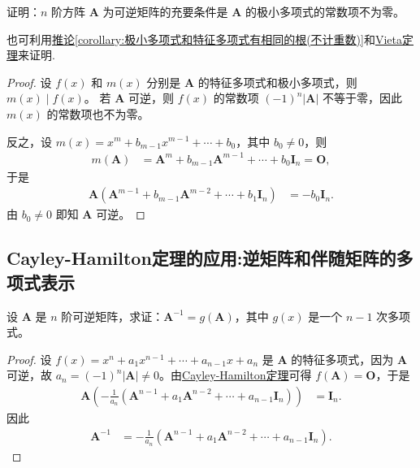 \documentclass[../../main.tex]{subfiles}%
\begin{document}
\begin{proposition}\label{proposition:矩阵可逆充要条件极小多项式常数项非零}
证明：\(n\) 阶方阵 \(\boldsymbol{A}\) 为可逆矩阵的充要条件是 \(\boldsymbol{A}\) 的极小多项式的常数项不为零。
\end{proposition}
\begin{note}
也可利用\hyperref[corollary:极小多项式和特征多项式有相同的根(不计重数)]{推论\ref{corollary:极小多项式和特征多项式有相同的根(不计重数)}}和\hyperref[theorem:Vieta定理]{Vieta定理}来证明.
\end{note}
\begin{proof}

设 \(f(x)\) 和 \(m(x)\) 分别是 \(\boldsymbol{A}\) 的特征多项式和极小多项式，则 \(m(x)\mid f(x)\)。
若 \(\boldsymbol{A}\) 可逆，则 \(f(x)\) 的常数项 \((-1)^n|\boldsymbol{A}|\) 不等于零，因此 \(m(x)\) 的常数项也不为零。

反之，设 \(m(x)=x^m + b_{m - 1}x^{m - 1}+\cdots + b_0\)，其中 \(b_0\neq 0\)，则
\begin{align*}
m(\boldsymbol{A})&=\boldsymbol{A}^m + b_{m - 1}\boldsymbol{A}^{m - 1}+\cdots + b_0\boldsymbol{I}_n=\boldsymbol{O},
\end{align*}
于是
\begin{align*}
\boldsymbol{A}(\boldsymbol{A}^{m - 1}+b_{m - 1}\boldsymbol{A}^{m - 2}+\cdots + b_1\boldsymbol{I}_n)&=-b_0\boldsymbol{I}_n.
\end{align*}
由 \(b_0\neq 0\) 即知 \(\boldsymbol{A}\) 可逆。

\end{proof}

\subsection{Cayley-Hamilton定理的应用:逆矩阵和伴随矩阵的多项式表示}

\begin{proposition}[矩阵的逆可由其多项式表示]\label{proposition:矩阵的逆可以用其多项式表示}
设 \(\boldsymbol{A}\) 是 \(n\) 阶可逆矩阵，求证：\(\boldsymbol{A}^{-1}=g(\boldsymbol{A})\)，其中 \(g(x)\) 是一个 \(n - 1\) 次多项式。
\end{proposition}
\begin{proof}

设 \(f(x)=x^n + a_1x^{n - 1}+\cdots + a_{n - 1}x + a_n\) 是 \(\boldsymbol{A}\) 的特征多项式，因为 \(\boldsymbol{A}\) 可逆，故 \(a_n = (-1)^n|\boldsymbol{A}|\neq 0\)。由\hyperref[theorem:Cayley-Hamilton定理]{Cayley-Hamilton定理}可得 \(f(\boldsymbol{A})=\boldsymbol{O}\)，于是
\begin{align*}
\boldsymbol{A}\left(-\frac{1}{a_n}(\boldsymbol{A}^{n - 1}+a_1\boldsymbol{A}^{n - 2}+\cdots + a_{n - 1}\boldsymbol{I}_n)\right)&=\boldsymbol{I}_n.
\end{align*}
因此
\begin{align*}
\boldsymbol{A}^{-1}&=-\frac{1}{a_n}(\boldsymbol{A}^{n - 1}+a_1\boldsymbol{A}^{n - 2}+\cdots + a_{n - 1}\boldsymbol{I}_n).
\end{align*} 

\end{proof}
\end{document}
